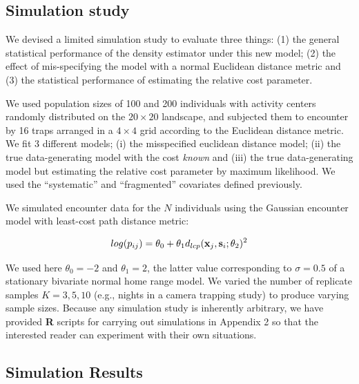 \documentclass[12pt]{article}
\begin{document}
\begin{spacing}{1.8}
\subsection{Simulation study}

We devised a limited simulation study to evaluate three things: (1)
the general statistical performance of the density estimator under
this new model; (2) the effect of mis-specifying the model with a
normal Euclidean distance metric and (3) the statistical performance
of estimating the relative cost parameter.

We used population sizes of 100 and 200 individuals with activity
centers randomly distributed on the $20 \times 20$ landscape, and subjected them
to encounter by 16 traps arranged in a $4\times 4$ grid according to
the Euclidean distance metric. We fit 3 different models; (i) the
misspecified euclidean distance model; (ii) the true data-generating
model with the cost {\it known} and (iii) the true
data-generating model but estimating the relative cost parameter by
maximum likelihood.  We used the ``systematic'' and ``fragmented'' %
covariates defined previously.

We simulated encounter data for the $N$ individuals using the Gaussian
encounter model with least-cost path distance metric:

\[
log(p_{ij})= \theta_{0} + \theta_{1} d_{lcp}({\bf x}_{j},{\bf
  s}_{i}; \theta_{2})^{2}
\]

{\flushleft We } used here $\theta_{0} = -2$ and $\theta_{1} = 2$, the latter value
corresponding to $\sigma = 0.5$ of a stationary bivariate normal home
range model.  We varied the number of replicate samples $K=3,5,10$
(e.g., nights in a camera trapping study) to produce varying sample
sizes.  Because any simulation study is inherently arbitrary, we have
provided {\bf R} scripts for carrying out simulations in Appendix 2 so
that the interested reader can experiment with their own situations.




\subsection{Simulation Results}


\end{spacing}
\end{document}
